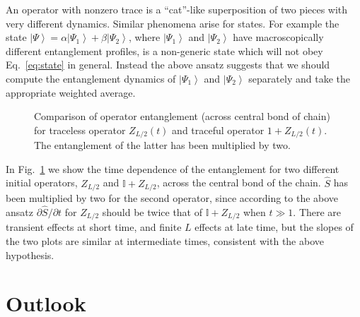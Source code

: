 \documentclass[aps,prx,twocolumn,superscriptaddress,floatfix,nofootinbib,prx]{revtex4}
\renewcommand{\>}{\right\rangle}
\newcommand{\<}{\left\langle}
\newcommand{\ket}[1]{\left| #1 \>}
\begin{document}
An operator with nonzero trace is a ``cat''-like superposition of two pieces with very different dynamics. Similar phenomena arise for states.  For example the state $\ket{\Psi} =\alpha  \ket{\Psi_1} + \beta \ket{\Psi_2}$, where $\ket{\Psi_1}$ and $\ket{\Psi_2}$ have macroscopically different entanglement profiles, is a non-generic state which will not obey Eq.~\ref{eq:state} in general. Instead the above ansatz suggests that we should compute the entanglement dynamics of $\ket{\Psi_1}$ and $\ket{\Psi_2}$ separately and take the appropriate weighted average.

\begin{figure}[t]
\caption{
Comparison of operator entanglement (across  central bond of  chain) for traceless operator $Z_{L/2}(t)$ and traceful operator $1+Z_{L/2}(t)$. The entanglement of the latter has been multiplied by two.
}  \label{fig:tracefulop}
\end{figure}

In  Fig.~\ref{fig:tracefulop} we show the time dependence of the entanglement for two different initial operators, $Z_{L/2}$ and ${\mathbb{I} + Z_{L/2}}$, across the central bond of the chain. $\hat S$ has been multiplied by two for the second operator, since according to the above ansatz $\partial \hat S/\partial t$ for $Z_{L/2}$ should be twice that of ${\mathbb{I}+ Z_{L/2}}$ when $t\gg 1$. There are transient effects at short time, and finite $L$ effects at late time, but the slopes of the two plots are similar at intermediate times, consistent with the above hypothesis.

\section{Outlook}
\label{conclusions}
\end{document}

